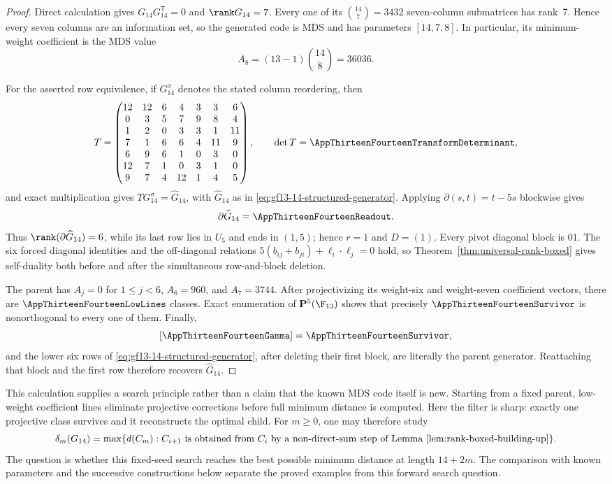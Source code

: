 \begin{proof}
Direct calculation gives \(G_{14}G_{14}^{\mathsf T}=0\) and
\(\rank G_{14}=7\). Every one of its
\(\binom{14}{7}=3432\) seven-column submatrices has rank~7. Hence every
seven columns are an information set, so the generated code is MDS and has
parameters \([14,7,8]\).  In particular, its minimum-weight coefficient is
the MDS value
\[
A_8=(13-1)\binom{14}{8}=36036.
\]

For the asserted row equivalence, if \(G_{14}^{\sigma}\) denotes the stated
column reordering, then
\[
T=\begin{pmatrix}
12&12&6&4&3&3&6\\
0&3&5&7&9&8&4\\
1&2&0&3&3&1&11\\
7&1&6&6&4&11&9\\
6&9&6&1&0&3&0\\
12&7&1&0&3&1&0\\
9&7&4&12&1&4&5
\end{pmatrix},
\qquad \det T=\AppThirteenFourteenTransformDeterminant,
\]
and exact multiplication gives
\(TG_{14}^{\sigma}=\widehat G_{14}\), with \(\widehat G_{14}\) as in
\eqref{eq:gf13-14-structured-generator}. Applying
\(\partial(s,t)=t-5s\) blockwise gives
\[
\partial\widehat G_{14}=\AppThirteenFourteenReadout.
\]
Thus \(\rank(\partial\widehat G_{14})=6\), while its last row lies in
\(U_5\) and ends in \((1,5)\); hence \(r=1\) and \(D=(1)\).
Every pivot diagonal block is \(01\).  The six forced diagonal identities
and the off-diagonal relations
\(5(b_{ij}+b_{ji})+\ell_i\cdot\ell_j=0\) hold, so
Theorem~\ref{thm:universal-rank-boxed} gives self-duality both before and
after the simultaneous row-and-block deletion.

The parent has \(A_j=0\) for \(1\le j<6\), \(A_6=960\), and
\(A_7=3744\). After projectivizing its weight-six and weight-seven
coefficient vectors, there are \(\AppThirteenFourteenLowLines\) classes.
Exact enumeration of \(\mathbf P^5(\F_{13})\) shows that precisely
\(\AppThirteenFourteenSurvivor\) is nonorthogonal to every one of them.
Finally,
\[
[\AppThirteenFourteenGamma]=\AppThirteenFourteenSurvivor,
\]
and the lower six rows of \eqref{eq:gf13-14-structured-generator}, after
deleting their first block, are literally the parent generator. Reattaching
that block and the first row therefore recovers \(\widehat G_{14}\).
\end{proof}

This calculation supplies a search principle rather than a claim that the
known MDS code itself is new.  Starting from a fixed parent, low-weight
coefficient lines eliminate projective corrections before full minimum
distance is computed.  Here the filter is sharp: exactly one projective class
survives and it reconstructs the optimal child.  For \(m\ge0\), one may
therefore study
\[
\delta_m(G_{14})=\max\{d(C_m): C_{i+1}\text{ is obtained from }C_i
\text{ by a non-direct-sum step of
Lemma~\ref{lem:rank-boxed-building-up}}\}.
\]
The question is whether this fixed-seed search reaches the best possible
minimum distance at length \(14+2m\).  The comparison with known parameters
and the successive constructions below separate the proved examples from this forward search
question.

\FloatBarrier
